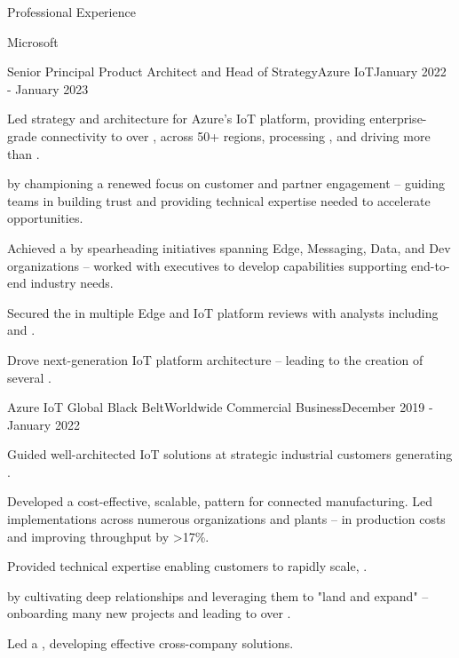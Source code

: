 \documentclass{resume} %
\begin{document}
\begin{rSection}{Professional Experience}
  \begin{rCompany}{Microsoft}{}{}
     \begin{rRole}{Senior Principal Product Architect and Head of Strategy}{Azure IoT}{January 2022 - January 2023}
        \item Led strategy and architecture for Azure's IoT platform, providing enterprise-grade connectivity to over , across 50+ regions, processing , and driving more than .
        \item {} by championing a renewed focus on customer and partner engagement -- guiding teams in building trust and providing technical expertise needed to accelerate opportunities.
        \item Achieved a  by spearheading initiatives spanning Edge, Messaging, Data, and Dev organizations -- worked with executives to develop capabilities supporting end-to-end industry needs.
        \item Secured the  in multiple Edge and IoT platform reviews with analysts including  and .
        \item Drove next-generation IoT platform architecture -- leading to the creation of several .
    \end{rRole}
    
    \begin{rRole}{Azure IoT Global Black Belt}{Worldwide Commercial Business}{December 2019 - January 2022}
        \item Guided well-architected IoT solutions at strategic industrial customers generating . 
        \item Developed a cost-effective, scalable, pattern for connected manufacturing. Led implementations across numerous organizations and plants --  in production costs and improving throughput by >17\%. 
        \item Provided technical expertise enabling customers to rapidly scale, .
        \item {} by cultivating deep relationships and leveraging them to "land and expand" -- onboarding many new projects and leading to over .\
        \item Led a , developing effective cross-company solutions.
    \end{rRole}
    

\end{rCompany}
\end{rSection}
\end{document}
